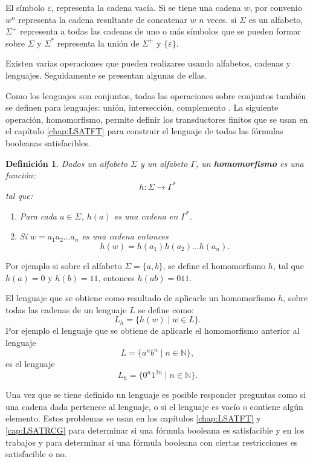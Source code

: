\documentclass[12pt]{article}
\newtheorem{definition}{Definición}
\begin{document}
El símbolo $\varepsilon$, representa la cadena vacía. Si se tiene una cadena $w$, por convenio  $w^n$ representa la cadena
resultante de concatenar $w$ $n$ veces. si $\Sigma$ es un alfabeto, $\Sigma^{+}$ representa a todas las cadenas de uno o más 
símbolos que se pueden formar sobre $\Sigma$ y  $\Sigma^*$  representa la unión de $\Sigma^{+}$ y $\{\varepsilon\}$.

Existen varias operaciones que pueden realizarse usando alfabetos, cadenas y lenguajes. Seguidamente se presentan algunas de ellas.

Como los lenguajes son conjuntos, todas las operaciones sobre conjuntos también se definen para lenguajes: unión, intersección, complemento \cite{authomataTheory}.
La siguiente operación, homomorfismo, permite definir los transductores finitos que se usan en el capítulo \ref{chap:LSATFT} para 
construir el lenguaje de todas las fórmulas booleanas satisfacibles.

\begin{definition}
  Dados un alfabeto \( \Sigma \) y un alfabeto \( \Gamma \), un \textbf{homomorfismo} es una función:
  \[
    h: \Sigma \to \Gamma^*
  \]
  tal que:
  \begin{enumerate}
    \item Para cada \( a \in \Sigma \), \( h(a) \) es una cadena en \( \Gamma^* \).
    \item Si $w=a_1a_2\ldots a_n$ es una cadena entonces
          $$h(w)=h(a_1)h(a_2)\ldots h(a_n).$$
  \end{enumerate}
\end{definition}

Por ejemplo si sobre el alfabeto $\Sigma=\{a,b\}$, se define el homomorfismo $h$, tal que $h(a)=0$ y $h(b)=11$, entonces
$h(ab)=011$.

El lenguaje que se obtiene como resultado de aplicarle un homomorfismo $h$, sobre todas las cadenas de un lenguaje $L$ se define como:
$$L_h=\{h(w)\mid w\in L\}.$$
Por ejemplo el lenguaje que se obtiene de aplicarle el homomorfismo anterior al lenguaje $$L=\{a^nb^n\mid n\in \mathbb{N}\},$$ es el lenguaje
$$L_h=\{0^n1^{2n}\mid n\in \mathbb{N}\}.$$

Una vez que se tiene definido un lenguaje es posible responder preguntas como si una cadena dada pertenece al lenguaje, o si el lenguaje es vacío o contiene algún elemento.
Estos problemas se usan en los capítulos \ref{chap:LSATFT} y \ref{cap:LSATRCG} para determinar si una fórmula booleana
es satisfacible y en los trabajos \cite{aCFSAT} y \cite{aSRCSAT} para determinar si una fórmula booleana con ciertas restricciones es 
satisfacible o no.
\end{document}
